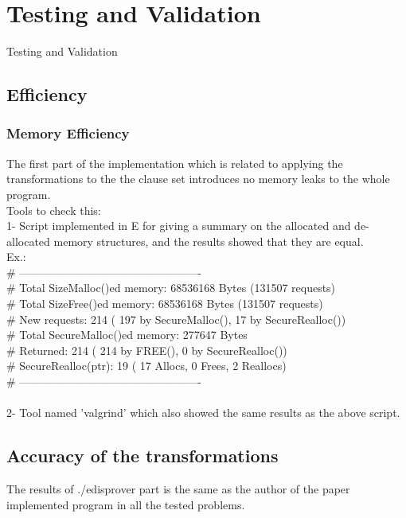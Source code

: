 \chapter{Testing and Validation}\label{chap:test_and_val}
Testing and Validation





\section{Efficiency}
\subsection{Memory Efficiency}
The first part of the implementation which is related to applying the transformations to the the clause set introduces no memory leaks to the whole program.
\\
Tools to check this: \\
1- Script implemented in E for giving a summary on the allocated and de-allocated memory structures, and the results showed that they are equal.
\\
Ex.:\\
\# -------------------------------------------------
\\
\# Total SizeMalloc()ed memory: 68536168 Bytes (131507 requests)
\\
\# Total SizeFree()ed   memory: 68536168 Bytes (131507 requests)
\\
\# New requests:    214 (   197 by SecureMalloc(),     17 by SecureRealloc())
\\
\# Total SecureMalloc()ed memory: 277647 Bytes
\\
\# Returned:       214 (   214 by FREE(),              0 by SecureRealloc())
\\
\# SecureRealloc(ptr):     19 (    17 Allocs,      0 Frees,      2 Reallocs)
\\
\# -------------------------------------------------
\\
\\
2- Tool named 'valgrind' which also showed the same results as the above script.

\section{Accuracy of the transformations}
The results of ./edisprover part is the same as the author of the paper implemented program in all the tested problems.